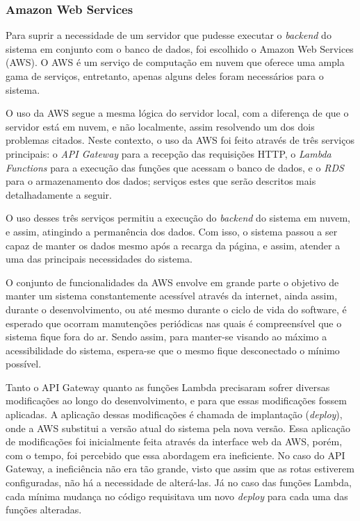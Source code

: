 \subsubsection{Amazon Web Services}

Para suprir a necessidade de um servidor que pudesse executar o \textit{backend} do sistema em conjunto com o banco de dados, foi escolhido o Amazon Web Services (AWS). O AWS é um serviço de computação em nuvem que oferece uma ampla gama de serviços, entretanto, apenas alguns deles foram necessários para o sistema.

O uso da AWS segue a mesma lógica do servidor local, com a diferença de que o servidor está em nuvem, e não localmente, assim resolvendo um dos dois problemas citados. Neste contexto, o uso da AWS foi feito através de três serviços principais: o \textit{API Gateway} para a recepção das requisições HTTP, o \textit{Lambda Functions} para a execução das funções que acessam o banco de dados, e o \textit{RDS} para o armazenamento dos dados; serviços estes que serão descritos mais detalhadamente a seguir.

O uso desses três serviços permitiu a execução do \textit{backend} do sistema em nuvem, e assim, atingindo a permanência dos dados. Com isso, o sistema passou a ser capaz de manter os dados mesmo após a recarga da página, e assim, atender a uma das principais necessidades do sistema.



O conjunto de funcionalidades da AWS envolve em grande parte o objetivo de manter um sistema constantemente acessível através da internet, ainda assim, durante o desenvolvimento, ou até mesmo durante o ciclo de vida do software, é esperado que ocorram manutenções periódicas nas quais é compreensível que o sistema fique fora do ar. Sendo assim, para manter-se visando ao máximo a acessibilidade do sistema, espera-se que o mesmo fique desconectado o mínimo possível.

Tanto o API Gateway quanto as funções Lambda precisaram sofrer diversas modificações ao longo do desenvolvimento, e para que essas modificações fossem aplicadas. A aplicação dessas modificações é chamada de implantação (\textit{deploy}), onde a AWS substitui a versão atual do sistema pela nova versão. Essa aplicação de modificações foi inicialmente feita através da interface web da AWS, porém, com o tempo, foi percebido que essa abordagem era ineficiente. No caso do API Gateway, a ineficiência não era tão grande, visto que assim que as rotas estiverem configuradas, não há a necessidade de alterá-las. Já no caso das funções Lambda, cada mínima mudança no código requisitava um novo \textit{deploy} para cada uma das funções alteradas.

